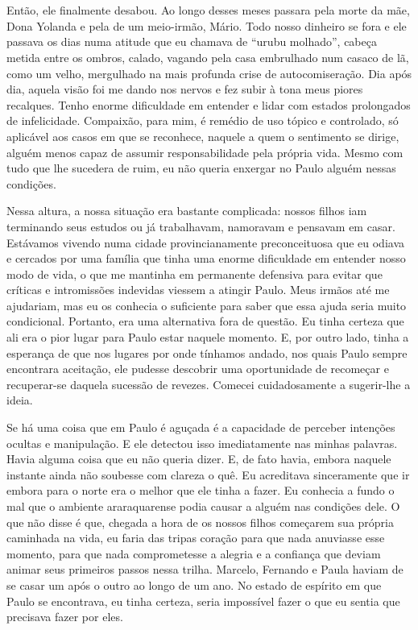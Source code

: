 \chapter{}

Então, ele finalmente desabou.
Ao longo desses meses passara pela morte da mãe, Dona Yolanda e pela de um meio-irmão, Mário.
Todo nosso dinheiro se fora e ele passava os dias numa atitude que eu chamava de ``urubu molhado'', cabeça metida entre os ombros, calado, vagando pela casa embrulhado num casaco de lã, como um velho, mergulhado na mais profunda crise de autocomiseração.
Dia após dia, aquela visão foi me dando nos nervos e fez subir à tona meus piores recalques.
Tenho enorme dificuldade em entender e lidar com estados prolongados de infelicidade.
Compaixão, para mim, é remédio de uso tópico e controlado, só aplicável aos casos em que se reconhece, naquele a quem o sentimento se dirige, alguém menos capaz de assumir responsabilidade pela própria vida.
Mesmo com tudo que lhe sucedera de ruim, eu não queria enxergar no Paulo alguém nessas condições.

Nessa altura, a nossa situação era bastante complicada: nossos filhos iam terminando seus estudos ou já trabalhavam, namoravam e pensavam em casar.
Estávamos vivendo numa cidade provincianamente preconceituosa que eu odiava e cercados por uma família que tinha uma enorme dificuldade em entender nosso modo de vida, o que me mantinha em permanente defensiva para evitar que críticas e intromissões indevidas viessem a atingir Paulo.
Meus irmãos até me ajudariam, mas eu os conhecia o suficiente para saber que essa ajuda seria muito condicional.
Portanto, era uma alternativa fora de questão.
Eu tinha certeza que ali era o pior lugar para Paulo estar naquele momento.
E, por outro lado, tinha a esperança de que nos lugares por onde tínhamos andado, nos quais Paulo sempre encontrara aceitação, ele pudesse descobrir uma oportunidade de recomeçar e recuperar-se daquela sucessão de revezes.
Comecei cuidadosamente a sugerir-lhe a ideia.

Se há uma coisa que em Paulo é aguçada é a capacidade de perceber intenções ocultas e manipulação.
E ele detectou isso imediatamente nas minhas palavras.
Havia alguma coisa que eu não queria dizer.
E, de fato havia, embora naquele instante ainda não soubesse com clareza o quê.
Eu acreditava sinceramente que ir embora para o norte era o melhor que ele tinha a fazer.
Eu conhecia a fundo o mal que o ambiente araraquarense podia causar a alguém nas condições dele.
O que não disse é que, chegada a hora de os nossos filhos começarem sua própria caminhada na vida, eu faria das tripas coração para que nada anuviasse esse momento, para que nada comprometesse a alegria e a confiança que deviam animar seus primeiros passos nessa trilha.
 Marcelo, Fernando e Paula haviam de se casar um após o outro ao longo de um ano.
No estado de espírito em que Paulo se encontrava, eu tinha certeza, seria impossível fazer o que eu sentia que precisava fazer por eles.

